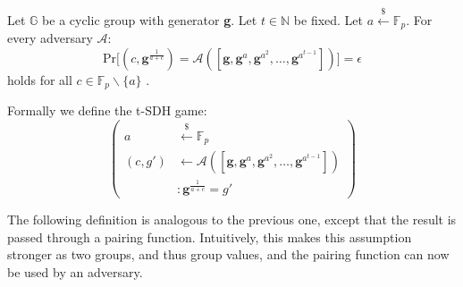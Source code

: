 \begin{definition}
    \label{tSDH_def}
    Let $\mathbb{G}$ be a cyclic group with generator \textbf{g}.
    Let $t \in \mathbb{N}$ be fixed.  Let $a \overset{{\scriptscriptstyle\$}}{\leftarrow} \mathbb{F}_p$. For every adversary $\mathcal{A}:$
    \begin{equation*}
        \text{Pr}\big[
            (c,\textbf{g}^{\frac{1}{a+c}}) = \mathcal{A}([\textbf{g},\textbf{g}^a,\textbf{g}^{a^2},\dots, \textbf{g}^{a^{t-1}}])
        \big] = \epsilon
    \end{equation*}
    holds for all $c \in \mathbb{F}_p\backslash \{a\}$ \parencite{KZG}.
    
    Formally we define the t-SDH game: 
    \begin{equation*}
        \left(
            \begin{aligned}
                a & \overset{{\scriptscriptstyle\$}}{\leftarrow} \mathbb{F}_p \\
                (c,g') & \leftarrow \mathcal{A}([\textbf{g},\textbf{g}^a,\textbf{g}^{a^2},\dots, \textbf{g}^{a^{t-1}}]) \\
                & : \textbf{g}^{\frac{1}{a+c}} = g'
            \end{aligned}
        \right)
    \end{equation*}
\end{definition}

The following definition is analogous to the previous one, except that the result is passed through a pairing function. Intuitively, this makes this assumption stronger as two groups, and thus group values, and the pairing function can now be used by an adversary.

